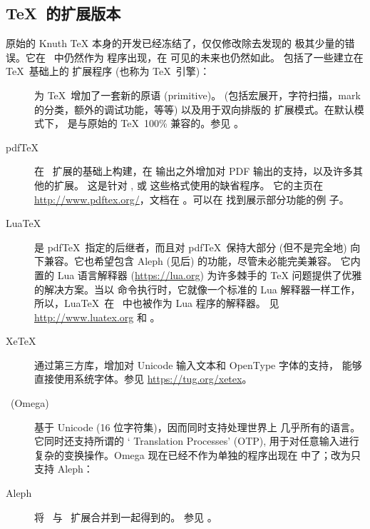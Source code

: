 \documentclass{article}
\begin{document}
\subsection{\protect\TeX\ 的扩展版本}
\label{sec:tex-extensions}

原始的 Knuth \TeX{} 本身的开发已经冻结了，仅仅修改除去发现的
极其少量的错误。它在 \TL\ 中仍然作为  程序出现，在
可见的未来也仍然如此。\TL{} 包括了一些建立在 \TeX\ 基础上的
扩展程序 (也称为 \TeX\ 引擎)：

\begin{description}

  \item [\eTeX] 为 \TeX\ 增加了一套新的原语 (primitive)。
        \label{text:etex} (包括宏展开，字符扫描，mark 的分类，额外的调试功能，等等)
        以及用于双向排版的 \TeXXeT{} 扩展模式。在默认模式下，\eTeX{} 是与原始的 \TeX\
        100\% 兼容的。参见 。

  \item [pdf\TeX] 在 \eTeX\ 扩展的基础上构建，在 \dvi{} 输出之外增加对
        PDF 输出的支持，以及许多其他的扩展。
        这是针对 ,  或  这些格式使用的缺省程序。
        它的主页在 \url{http://www.pdftex.org/}，文档在
        。可以在
         找到展示部分功能的例
        子。

  \item  [Lua\TeX] 是 pdf\TeX\ 指定的后继者，而且对 pdf\TeX\ 保持大部分
        (但不是完全地) 向下兼容。它也希望包含 Aleph (见后) 的功能，尽管未必能完美兼容。
        它内置的 Lua 语言解释器 (\url{https://lua.org}) 为许多棘手的 \TeX{}
        问题提供了优雅的解决方案。当以  命令执行时，它就像一个标准的
        Lua 解释器一样工作，所以，Lua\TeX\ 在 \TL\ 中也被作为 Lua 程序的解释器。
        见 \url{http://www.luatex.org} 和 。

  \item [Xe\TeX] 通过第三方库，增加对 Unicode 输入文本和 OpenType 字体的支持，
        能够直接使用系统字体。参见 \url{https://tug.org/xetex}。

  \item [\OMEGA\ (Omega)] 基于 Unicode (16 位字符集)，因而同时支持处理世界上
        几乎所有的语言。它同时还支持所谓的 `\OMEGA{} Translation Processes' (OTP),
        用于对任意输入进行复杂的变换操作。Omega 现在已经不作为单独的程序出现在 \TL{}
        中了；改为只支持 Aleph：

  \item [Aleph] 将 \OMEGA\ 与 \eTeX\ 扩展合并到一起得到的。
        参见 。

\end{description}
\end{document}
